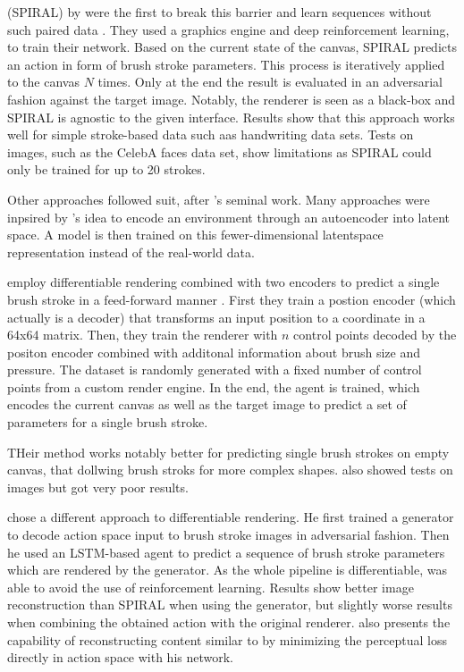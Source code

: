  (SPIRAL) by \citeauthor*{SPIRAL} were the first to break this barrier and learn sequences without such paired data \cite{SPIRAL}.
They used a graphics engine and deep reinforcement learning, to train their network.
Based on the current state of the canvas, SPIRAL predicts an action in form of brush stroke parameters.
This process is iteratively applied to the canvas $N$ times.
Only at the end the result is evaluated in an adversarial fashion against the target image.
Notably, the renderer is seen as a black-box and SPIRAL is agnostic to the given interface.
Results show that this approach works well for simple stroke-based data such aas handwriting data sets.
Tests on images, such as the CelebA faces data set, show limitations as SPIRAL could only be trained for up to 20 strokes.


Other approaches followed suit, after \citeauthor*{SPIRAL}'s seminal work.
Many approaches were inpsired by \citeauthor{worldmodel}'s idea to encode an environment through an autoencoder into latent space.
A model is then trained on this fewer-dimensional latentspace representation instead of the real-world data.


\citeauthor*{strokenet} employ differentiable rendering combined with two encoders to predict a single brush stroke in a feed-forward manner \cite{strokenet}.
First they train a postion encoder (which actually is a decoder) that transforms an input position to a coordinate in a 64x64 matrix.
Then, they train the renderer with $n$ control points decoded by the positon encoder combined with additonal information about brush size and pressure.
The dataset is randomly generated with a fixed number of control points from a custom render engine.
In the end, the agent is trained, which encodes the current canvas as well as the target image to predict a set of parameters for a single brush stroke.

THeir method works notably better for predicting single brush strokes on empty canvas, that dollwing brush stroks for more complex shapes.
\citeauthor*{strokenet} also showed tests on images but got very poor results.

\citeauthor*{neuralpainters} chose a different approach to differentiable rendering.
He first trained a generator to decode action space input to brush stroke images in adversarial fashion.
Then he used an LSTM-based agent to predict a sequence of brush stroke parameters which are rendered by the generator.
As the whole pipeline is differentiable, \citeauthor{neuralpainters} was able to avoid the use of reinforcement learning.
Results show better image reconstruction than SPIRAL when using the generator, but slightly worse results when combining the obtained action with the original renderer.
\citeauthor{neuralpainters} also presents the capability of reconstructing content similar to \citeauthor{gatys} by minimizing the perceptual loss directly in action space with his network.

